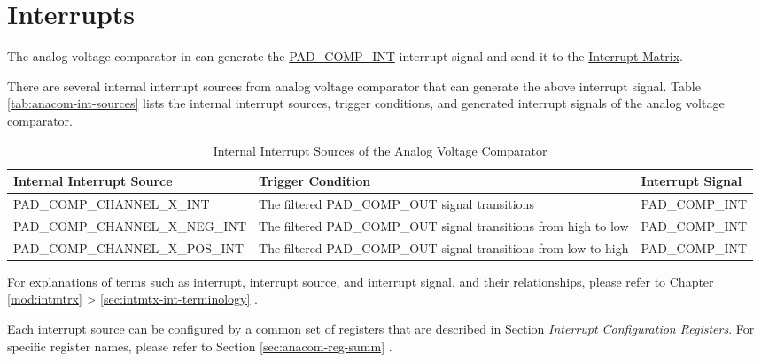 \documentclass[main\_\_EN.tex]{subfiles}
\begin{document}

\section{Interrupts}

The analog voltage comparator in \chipname{} can generate the \hyperref[int:PADCOMPINT]{PAD\_COMP\_INT} interrupt signal and send it to the \hyperref[mod:intmtrx]{Interrupt Matrix}.

There are several internal interrupt sources from analog voltage comparator that can generate the above interrupt signal. Table \ref{tab:anacom-int-sources} lists the internal interrupt sources, trigger conditions, and generated interrupt signals of the analog voltage comparator.

\begin{table}[H]
\centering
\caption{Internal Interrupt Sources of the Analog Voltage Comparator}
\label{tab:anacom-int-sources}
\begin{tabular}{ | L{6cm} | L{5.5cm} | L{4cm} | }
\hline
{}
\textbf{Internal Interrupt Source} & \textbf{Trigger Condition}  &  \textbf{Interrupt Signal}\\ \hline
\label{int:PADCOMPnALLINT}PAD\_COMP\_CHANNEL\_X\_INT  & The filtered PAD\_COMP\_OUT signal transitions  &  \label{int:PADCOMPINT}PAD\_COMP\_INT  \\ \hline
\label{int:PADCOMPnNEGINT}PAD\_COMP\_CHANNEL\_X\_NEG\_INT  & The filtered PAD\_COMP\_OUT signal transitions from high to low   & PAD\_COMP\_INT \\ \hline
\label{int:PADCOMPnPOSINT}PAD\_COMP\_CHANNEL\_X\_POS\_INT & The filtered PAD\_COMP\_OUT signal transitions from low to high  & PAD\_COMP\_INT \\ \hline
\end{tabular}
\end{table}

\begin{tiplisting}
For explanations of terms such as interrupt, interrupt source, and interrupt signal, and their relationships, please refer to Chapter \ref{mod:intmtrx} \textit{} > \ref{sec:intmtx-int-terminology} \textit{}.
\end{tiplisting}

Each interrupt source can be configured by a common set of registers that are described in Section \hyperref[interrupt-config-registers]{\textit{Interrupt Configuration Registers}}. For specific register names, please refer to Section \ref{sec:anacom-reg-summ} \textit{}.
\end{document}
